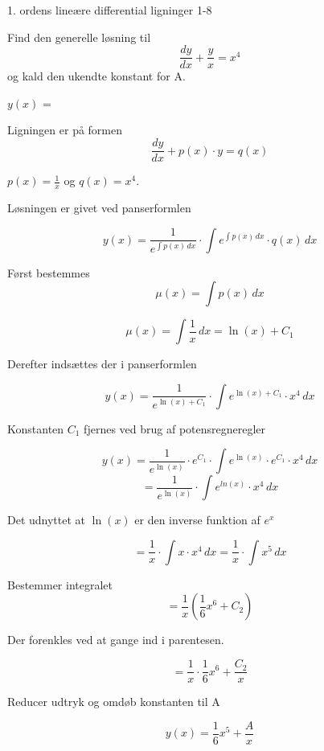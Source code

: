 \documentclass{article}
\begin{document}
\newpage

\begin{exercise}{1. ordens lineære differential ligninger 1-8}
	
	
	Find den generelle løsning til
	\[
	\frac{dy}{dx} +  \frac{y}{x} = x^4
	\]
	og kald den ukendte konstant for A.
	
	$y(x)$ =   
	
	
	
	\hint
	
	Ligningen er på formen
	\[
	\frac{dy}{dx} + p(x) \cdot y = q(x)
	\]
	
	\hint
	
	$p(x)=\frac{1}{x}$ og $q(x)=x^4$.
	
	\hint
	
	Løsningen er givet ved panserformlen
	
	
	\hint
	
	\[
	y(x) = \frac{1}{e^{\int p(x) \, dx}} \cdot \int e^{\int p(x) \, dx}  \cdot q(x) \, dx
	\]
	
	\hint
	
	Først bestemmes 
	\[
	\mu(x) = \int p(x) \, dx
	\]
	
	\hint
	\[
	\mu(x) = \int \frac{1}{x} \, dx = \ln(x)+ C_1
	\]
	
	\hint
	Derefter indsættes der i  panserformlen
	
	\hint
	
	\[
	y(x) = \frac{1}{e^{\ln(x) + C_1}} \cdot \int e^{\ln(x) + C_1}  \cdot x^4 \, dx
	\]
	
	
	\hint
	
	Konstanten $C_1$ fjernes ved brug af potensregneregler
	
	\hint
	\[
	y(x) = \frac{1}{e^{\ln(x)}} \cdot e^{C_1} \cdot \int e^{\ln(x)} \cdot e^{C_1}  \cdot x^4 \, dx  
	\]
	\[
	= \frac{1}{e^{\ln(x)}} \cdot \int e^{ln(x)}  \cdot x^4 \, dx
	\]
	
	\hint
	
	Det udnyttet at $\ln(x)$ er den inverse funktion af $e^x$
	
	
	\hint
	\[
	= \frac{1}{x} \cdot \int x  \cdot x^4 \, dx =  \frac{1}{x} \cdot \int  x^5 \, dx
	\]
	
	\hint
	
	Bestemmer integralet
	\[
	= \frac{1}{x} \left( \frac{1}{6}x^6 + C_2    \right)
	\]
	
	\hint
	
	Der forenkles ved at gange ind i parentesen.
	
	\hint
	\[
	= \frac{1}{x} \cdot \frac{1}{6}x^6 + \frac{C_2}{x} 
	\]
	
	\hint
	
	Reducer udtryk og omdøb konstanten til A
	
	\hint
	\[
	y(x) =  \frac{1}{6}x^5 + \frac{A}{x}
	\]
	
	
\end{exercise}
\end{document}
